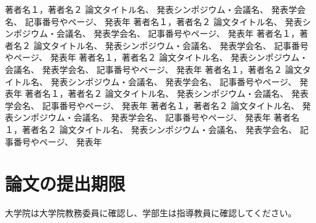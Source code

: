 \documentclass[a4paper]{jsarticle}
\begin{document}
\begin{thebibliography}{999}
  著者名１，著者名２
  論文タイトル名、
  発表シンポジウム・会議名、
  発表学会名、
  記事番号やページ、
  発表年
  著者名１，著者名２
  論文タイトル名、
  発表シンポジウム・会議名、
  発表学会名、
  記事番号やページ、
  発表年
  著者名１，著者名２
  論文タイトル名、
  発表シンポジウム・会議名、
  発表学会名、
  記事番号やページ、
  発表年
  著者名１，著者名２
  論文タイトル名、
  発表シンポジウム・会議名、
  発表学会名、
  記事番号やページ、
  発表年
  著者名１，著者名２
  論文タイトル名、
  発表シンポジウム・会議名、
  発表学会名、
  記事番号やページ、
  発表年
  著者名１，著者名２
  論文タイトル名、
  発表シンポジウム・会議名、
  発表学会名、
  記事番号やページ、
  発表年
  著者名１，著者名２
  論文タイトル名、
  発表シンポジウム・会議名、
  発表学会名、
  記事番号やページ、
  発表年
  著者名１，著者名２
  論文タイトル名、
  発表シンポジウム・会議名、
  発表学会名、
  記事番号やページ、
  発表年

\end{thebibliography}

\section*{論文の提出期限}
大学院は大学院教務委員に確認し、学部生は指導教員に確認してください。
\end{document}
